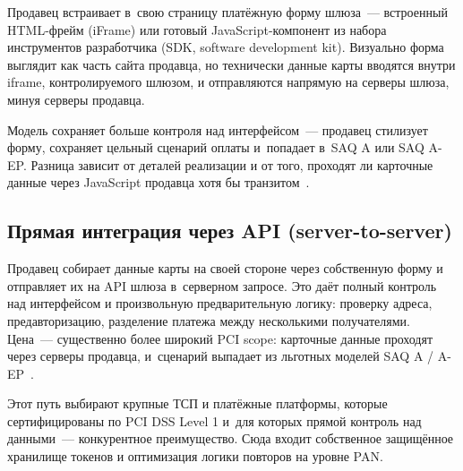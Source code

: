 Продавец встраивает в~свою страницу платёжную форму шлюза~---
встроенный HTML-фрейм (iFrame) или готовый JavaScript-компонент
из набора инструментов разработчика (SDK, software development kit).
Визуально форма выглядит как часть сайта продавца, но технически
данные карты вводятся внутри iframe, контролируемого шлюзом,
и отправляются напрямую на серверы шлюза, минуя серверы продавца.

Модель сохраняет больше контроля над интерфейсом~--- продавец
стилизует форму, сохраняет цельный сценарий оплаты и~попадает
в~SAQ A или SAQ A-EP. Разница зависит
от деталей реализации и от того, проходят ли карточные данные
через JavaScript продавца хотя бы транзитом~\cite{pci-faq-1291,pci-faq-1293}.

\subsection*{Прямая интеграция через API (server-to-server)}

Продавец собирает данные карты на своей стороне через
собственную форму и отправляет их на API шлюза
в~серверном запросе. Это даёт полный контроль над
интерфейсом и произвольную предварительную логику:
проверку адреса, предавторизацию, разделение платежа
между несколькими получателями. Цена~--- существенно более широкий
PCI scope: карточные данные проходят
через серверы продавца, и~сценарий выпадает из льготных моделей
SAQ A / A-EP~\cite{pci-faq-1291,pci-faq-1293,pci-saq}.

Этот путь выбирают крупные ТСП и платёжные платформы,
которые сертифицированы по PCI DSS Level 1 и~для которых прямой
контроль над данными~--- конкурентное преимущество.
Сюда входит собственное защищённое хранилище токенов
и оптимизация логики повторов на уровне PAN.


